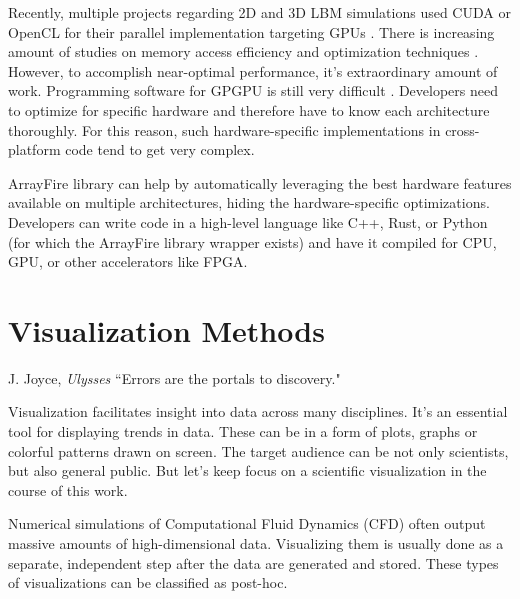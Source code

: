 Recently, multiple projects regarding 2D and 3D LBM simulations used CUDA or OpenCL for their parallel implementation targeting GPUs \cite{delboscRealTimeSimulationIndoor, delboscOptimizedImplementationLattice2014,  januszewskiSailfishFlexibleMultiGPU2014, boroniFULLGPUImplementation2017, kotsalosDigitalBloodMassively2019, kolihaOnlineVisualizationInteractive2015, szokePerformanceEvaluationTwoDimensional2017, harwoodLUMAManycoreFluid2018, harwoodParallelisationInteractiveLatticeBoltzmann2017}. There is increasing amount of studies on memory access efficiency and optimization techniques \cite{herschlagGPUDataAccess2018, tranPerformanceOptimization3D2017}. However, to accomplish near-optimal performance, it's extraordinary amount of work. Programming software for GPGPU is still very difficult \cite{amalcolmArrayFireGPUAcceleration2012a}. Developers need to optimize for specific hardware and therefore have to know each architecture thoroughly. For this reason, such hardware-specific implementations in cross-platform code tend to get very complex.

ArrayFire library can help by automatically leveraging the best hardware features available on multiple architectures, hiding the hardware-specific optimizations. Developers can write code in a high-level language like C++, Rust, or Python (for which the ArrayFire library wrapper exists) and have it compiled for CPU, GPU, or other accelerators like FPGA.


\section{Visualization Methods}\label{sec:vizmethods}
\begin{chapquote}{J. Joyce, \textit{Ulysses}}
	``Errors are the portals to discovery."
\end{chapquote}

Visualization facilitates insight into data across many disciplines. It's an essential tool for displaying trends in data. These can be in a form of plots, graphs or colorful patterns drawn on screen. The target audience can be not only scientists, but also general public. But let's keep focus on a scientific visualization in the course of this work. 

Numerical simulations of Computational Fluid Dynamics (CFD) often output massive amounts of high-dimensional data. Visualizing them is usually done as a separate, independent step after the data are generated and stored. These types of visualizations can be classified as post-hoc. 

